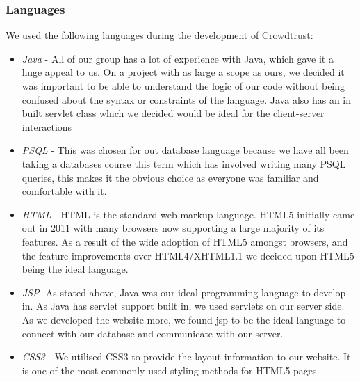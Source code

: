 \documentclass[11pt]{article}
\begin{document}
\subsubsection{Languages}
We used the following languages during the development of Crowdtrust:
\begin{itemize}
\item
\emph{Java} - All of our group has a lot of experience with Java, which gave it a huge appeal to us.
On a project with as large a scope as ours, we decided it was important to be able
to understand the logic of our code without being confused about the syntax or
constraints of the language. Java also has an in built servlet class which we
decided would be ideal for the client-server interactions 
\item
\emph{PSQL} - This was chosen for out database language because we have all been
taking a databases course this term which has involved writing many PSQL queries,
this makes it the obvious choice as everyone was familiar and comfortable with it.
\item
\emph{HTML} -
HTML is the standard web markup language. HTML5 initially came out in 2011 with many
browsers now supporting a large majority of its features. As a result of the wide
adoption of HTML5 amongst browsers, and the feature improvements over HTML4/XHTML1.1
we decided upon HTML5 being the ideal language.
\item
\emph{JSP} -As stated above, Java was our ideal programming language to develop in. As Java
has servlet support built in, we used servlets on our server side. As we developed
the website more, we found jsp to be the ideal language to connect with our database
and communicate with our server.
\item
\emph{CSS3} - We utilised CSS3 to provide the layout information to our website. It is one of the
most commonly used styling methods for HTML5 pages
\end{itemize}
\end{document}
